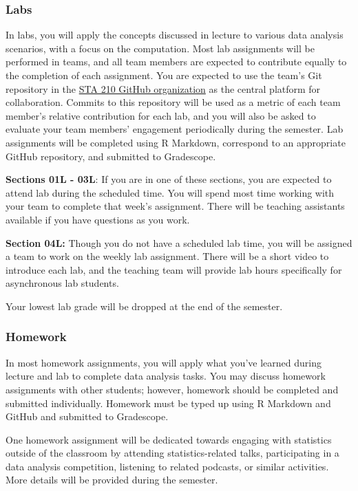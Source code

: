 \documentclass[
]{article}
\begin{document}
\hypertarget{labs}{%
\subsubsection{Labs}\label{labs}}

In labs, you will apply the concepts discussed in lecture to various
data analysis scenarios, with a focus on the computation. Most lab
assignments will be performed in teams, and all team members are
expected to contribute equally to the completion of each assignment. You
are expected to use the team's Git repository in the
\href{https://github.com/sta210-sp21}{STA 210 GitHub organization} as
the central platform for collaboration. Commits to this repository will
be used as a metric of each team member's relative contribution for each
lab, and you will also be asked to evaluate your team members'
engagement periodically during the semester. Lab assignments will be
completed using R Markdown, correspond to an appropriate GitHub
repository, and submitted to Gradescope.

\textbf{Sections 01L - 03L}: If you are in one of these sections, you
are expected to attend lab during the scheduled time. You will spend
most time working with your team to complete that week's assignment.
There will be teaching assistants available if you have questions as you
work.

\textbf{Section 04L:} Though you do not have a scheduled lab time, you
will be assigned a team to work on the weekly lab assignment. There will
be a short video to introduce each lab, and the teaching team will
provide lab hours specifically for asynchronous lab students.

Your lowest lab grade will be dropped at the end of the semester.

\hypertarget{homework}{%
\subsubsection{Homework}\label{homework}}

In most homework assignments, you will apply what you've learned during
lecture and lab to complete data analysis tasks. You may discuss
homework assignments with other students; however, homework should be
completed and submitted individually. Homework must be typed up using R
Markdown and GitHub and submitted to Gradescope.

One homework assignment will be dedicated towards engaging with
statistics outside of the classroom by attending statistics-related
talks, participating in a data analysis competition, listening to
related podcasts, or similar activities. More details will be provided
during the semester.
\end{document}
